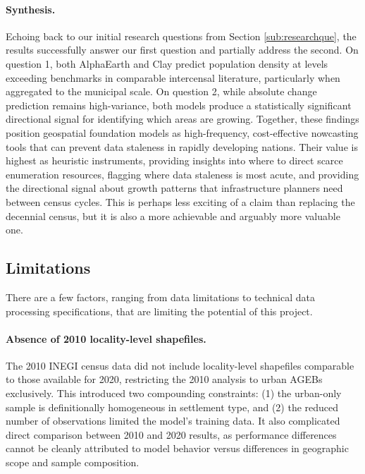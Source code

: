 \documentclass[12pt,letterpaper]{article}
\begin{document}
\paragraph{Synthesis.}
Echoing back to our initial research questions from Section \ref{sub:researchque}, the results successfully answer our first question and partially address the second. On question 1, both AlphaEarth and Clay predict population density at levels exceeding benchmarks in comparable intercensal literature, particularly when aggregated to the municipal scale. On question 2, while absolute change prediction remains high-variance, both models produce a statistically significant directional signal for identifying which areas are growing. Together, these findings position geospatial foundation models as high-frequency, cost-effective nowcasting tools that can prevent data staleness in rapidly developing nations. Their value is highest as heuristic instruments, providing insights into where to direct scarce enumeration resources, flagging where data staleness is most acute, and providing the directional signal about growth patterns that infrastructure planners need between census cycles. This is perhaps less exciting of a claim than replacing the decennial census, but it is also a more achievable and arguably more valuable one.


\subsection{Limitations}
\label{sub:limitation}

There are a few factors, ranging from data limitations to technical data processing specifications, that are limiting the potential of this project.

\paragraph{Absence of 2010 locality-level shapefiles.}
The 2010 INEGI census data did not include locality-level shapefiles comparable to those available for 2020, restricting the 2010 analysis to urban AGEBs exclusively. This introduced two compounding constraints: (1) the urban-only sample is definitionally homogeneous in settlement type, and (2) the reduced number of observations limited the model's training data. It also complicated direct comparison between 2010 and 2020 results, as performance differences cannot be cleanly attributed to model behavior versus differences in geographic scope and sample composition.
\end{document}
